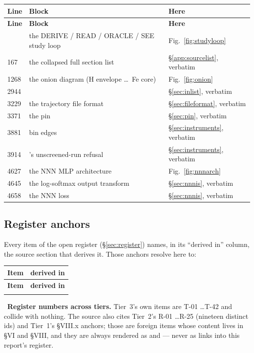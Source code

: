\begingroup
\small
\begin{longtable}{@{}L{1.4cm} L{9.4cm} L{4.2cm}@{}}
\toprule
\textbf{Line} & \textbf{Block} & \textbf{Here} \\
\midrule
\endfirsthead
\toprule
\textbf{Line} & \textbf{Block} & \textbf{Here} \\
\midrule
\endhead
\bottomrule
{} & the DERIVE / READ / ORACLE / SEE study loop & Fig.~\ref{fig:studyloop} \\
167 & the collapsed full section list & \S\ref{app:sourcelist}, verbatim \\
1268 & the onion diagram (H envelope \ldots\ Fe core) & Fig.~\ref{fig:onion} \\
2944 &  & \S\ref{sec:inlist}, verbatim \\
3229 & the trajectory file format & \S\ref{sec:fileformat}, verbatim \\
3371 & the  pin & \S\ref{sec:pin}, verbatim \\
3881 &  bin edges & \S\ref{sec:instruments}, verbatim \\
3914 & 's unscreened-run refusal & \S\ref{sec:instruments}, verbatim \\
4627 & the NNN MLP architecture & Fig.~\ref{fig:nnnarch} \\
4645 & the log-softmax output transform & \S\ref{sec:nnnis}, verbatim \\
4658 & the NNN loss & \S\ref{sec:nnnis}, verbatim \\
\end{longtable}
\endgroup

\subsection{Register anchors}
\label{app:registeranchors}

Every item of the open register (\S\ref{sec:register}) names, in its ``derived
in'' column, the source section that derives it. Those anchors resolve here to:

\begingroup
\small
\begin{longtable}{@{}L{1.4cm} L{12cm}@{}}
\toprule
\textbf{Item} & \textbf{derived in} \\
\midrule
\endfirsthead
\toprule
\textbf{Item} & \textbf{derived in} \\
\midrule
\endhead
\bottomrule
\endfoot

\end{longtable}
\endgroup

\begin{aside}
\warnglyph{}~\textbf{Register numbers across tiers.} Tier~3's own items are
T-01 \ldots T-42 and collide with nothing. The source also cites Tier~2's
R-01 \ldots R-25 (nineteen distinct ids) and Tier~1's \S VIII.x anchors; those
are foreign items whose content lives in  \S VI and
 \S VIII, and they are always rendered as
 and  --- never as links into this
report's register.
\end{aside}
